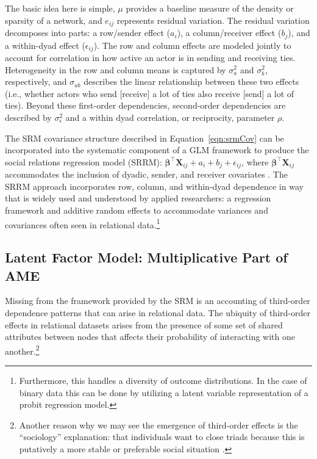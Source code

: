 \documentclass[11pt,pdflatex]{elsarticle}
\begin{document}
The basic idea here is simple, $\mu$ provides a baseline measure of the density or sparsity of a network, and $e_{ij}$ represents residual variation. The residual variation decomposes into parts: a row/sender effect ($a_{i}$), a column/receiver effect ($b_{j}$), and a within-dyad effect ($\epsilon_{ij}$). The row and column effects are modeled jointly to account for correlation in how active an actor is in sending and receiving ties. Heterogeneity in the row and column means is captured by $\sigma_{a}^{2}$ and $\sigma_{b}^{2}$, respectively, and $\sigma_{ab}$ describes the linear relationship between these two effects (i.e., whether actors who send [receive] a lot of ties also receive [send] a lot of ties). Beyond these first-order dependencies, second-order dependencies are described by $\sigma_{\epsilon}^{2}$ and a within dyad correlation, or reciprocity, parameter $\rho$. 

The SRM covariance structure described in Equation~\ref{eqn:srmCov} can be incorporated into the systematic component of a GLM framework to produce the social relations regression model (SRRM): $\bm\beta^{\top} \mathbf{X}_{ij} + a_{i} + b_{j} + \epsilon_{ij}$, where $ \bm\beta^{\top} \mathbf{X}_{ij}$ accommodates the inclusion of dyadic, sender, and receiver covariates \citep{hoff:2005}. The SRRM approach incorporates row, column, and within-dyad dependence in way that is widely used and understood by applied researchers: a regression framework and additive random effects to accommodate variances and covariances often seen in relational data.\footnote{Furthermore, this  handles a diversity of outcome distributions. In the case of binary data this can be done by utilizing a latent variable representation of a probit regression model.}

\subsection{Latent Factor Model: Multiplicative Part of AME}

Missing from the framework provided by the SRM is an accounting of third-order dependence patterns that can arise in relational data. The ubiquity of third-order effects in relational datasets arises from the presence of some set of shared attributes between nodes that affects their probability of interacting with one another.\footnote{Another reason why we may see the emergence of third-order effects is the ``sociology'' explanation: that individuals want to close triads because this is putatively a more stable or preferable social situation \citep{wasserman:faust:1994}.} 
\end{document}
